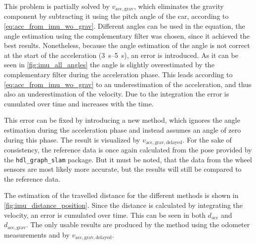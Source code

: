 This problem is partially solved by $v_\mathrm{acc, grav}$, which eliminates the gravity component by subtracting it using the pitch angle of the car, according to \cref{eq:acc_from_imu_wo_grav}.
Different angles can be used in the equation, the angle estimation using the complementary filter was chosen, since it achieved the best results.
Nonetheless, because the angle estimation of the angle is not correct at the start of the acceleration (\SIrange{3}{5}{\second}), an error is introduced.
As it can be seen in \cref{fig:imu_all_angles} the angle is slightly overestimated by the complementary filter during the acceleration phase.
This leads according to \cref{eq:acc_from_imu_wo_grav} to an underestimation of the acceleration, and thus also an underestimation of the velocity.
Due to the integration the error is cumulated over time and increases with the time.

This error can be fixed by introducing a new method, which ignores the angle estimation during the acceleration phase and instead assumes an angle of zero during this phase.
The result is visualized by $v_\mathrm{acc, grav, delayed}$.
For the sake of consistency, the reference data is once again calculated from the pose provided by the \texttt{hdl\_graph\_slam} package.
But it must be noted, that the data from the wheel sensors are most likely more accurate, but the results will still be compared to the reference data.

The estimation of the travelled distance for the different methods is shown in \cref{fig:imu_distance_position}.
Since the distance is calculated by integrating the velocity, an error is cumulated over time.
This can be seen in both $d_\mathrm{acc}$ and $d_\mathrm{acc, grav}$.
The only usable results are produced by the method using the odometer measurements and by $v_\mathrm{acc, grav, delayed}$.

